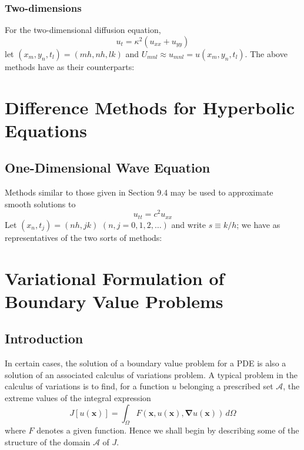 \documentclass[11pt]{book}
\theoremstyle{example}
\theoremstyle{problem}
\theoremstyle{theorem}
\theoremstyle{definition}
\begin{document}
\subsection{Two-dimensions}
For the two-dimensional diffusion equation,
\begin{equation}
	u_t=\kappa^2(u_{xx}+u_{yy})
\end{equation}
let $(x_m,y_n,t_l)=(mh,nh,lk)$ and $U_{mnl}{\approx}u_{mnl}=u(x_m,y_n,t_l)$. The above methods have as their counterparts:


\chapter[DM for Hyperbolic Equations]{Difference Methods for Hyperbolic Equations}

\section{One-Dimensional Wave Equation}
Methods similar to those given in Section 9.4 may be used to approximate smooth solutions to
\begin{equation}
	u_{tt}=c^2u_{xx}
\end{equation}
Let $(x_n,t_j)=(nh,jk)$ $(n,j=0,1,2,\dots)$ and write $s{\equiv}k/h$; we have as representatives of the two sorts of methods:

\chapter[Variational Formulation of BVP]{Variational Formulation of Boundary Value Problems}
\section{Introduction}
In certain cases, the solution of a boundary value problem for a PDE is also a solution of an associated calculus of variations problem. A typical problem in the calculus of variations is to find, for a function $u$ belonging a prescribed set $\mathscr{A}$, the extreme values of the integral expression
\begin{equation}
	J[u(\mathbf{x})]=\int_\Omega{F(\mathbf{x},u(\mathbf{x}),\mathbf{\nabla}u(\mathbf{x}))\,d\Omega}
\end{equation}
where $F$ denotes a given function. Hence we shall begin by describing some of the structure of the domain $\mathscr{A}$ of $J$.
\end{document}
